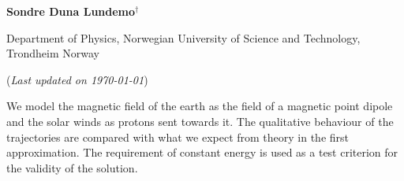 


	
\begin{titlepage}
	\begin{center}
	\setlength{\parskip}{0em}
	\thispagestyle{titlepage}
	

	\vspace{4mm}
	
	\large{\textbf{Sondre Duna Lundemo}}$^\dagger$
	
	\normalsize{Department of Physics, Norwegian University of Science and Technology, Trondheim Norway 
	}

	(\textit{Last updated on \today})
	\end{center}

	\setlength{\parindent}{2em}
	
	We model the magnetic field of the earth as the field of a magnetic point dipole and the solar winds as protons sent towards it. The qualitative behaviour of the trajectories are compared with what we expect from theory in the first approximation.
	The requirement of constant energy is used as a test criterion for the validity of the solution.
	
\end{titlepage}

\setlength{\parskip}{1em}









